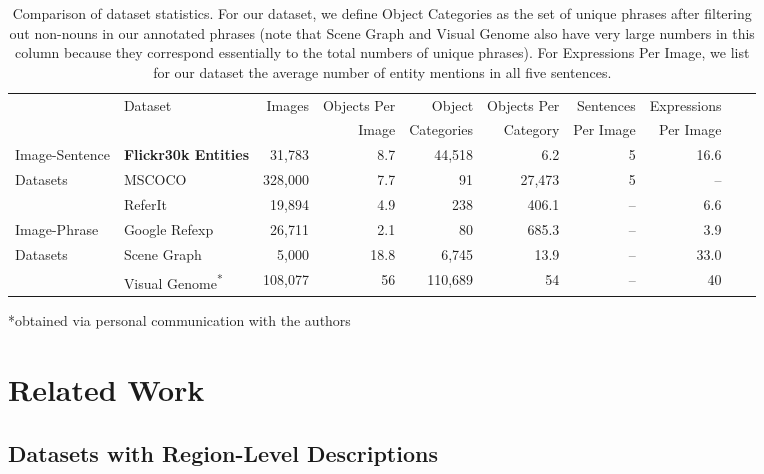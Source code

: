 \documentclass[twocolumn]{svjour3}
\begin{document}
\begin{table*}
\caption{Comparison of dataset statistics. For our dataset, we define Object Categories as the set of unique phrases after filtering out non-nouns in our annotated phrases (note that Scene Graph and Visual Genome also have very large numbers in this column because they correspond essentially to the total numbers of unique phrases). For Expressions Per Image, we list for our dataset the average number of entity mentions in all five sentences. }
\label{table:dataCompare}
\centering
\begin{tabular}{|l|l|r|r|r|r|r|r|r|r|}
\hline
& \multirow{2}{*}{Dataset} & \multirow{2}{*}{Images} &Objects Per & Object & Objects Per & Sentences & Expressions\\
&  & & Image & Categories &Category &  Per Image & Per Image\\
\hline
Image-Sentence & {\bf Flickr30k Entities} & 31,783 & 8.7 & 44,518 & 6.2 & 5 & 16.6 \\
Datasets & MSCOCO~\citep{lin2014microsoft} & 328,000 & 7.7 & 91 & 27,473 & 5 & -- \\
 \hline
 & ReferIt~\citep{kazemzadeh-EtAl:2014:EMNLP2014} & 19,894 & 4.9 & 238 & 406.1 & -- & 6.6\\
Image-Phrase & Google Refexp~\citep{mao2015generation} & 26,711 & 2.1 & 80 & 685.3 & -- & 3.9\\
Datasets & Scene Graph~\citep{Johnson2015CVPR} & 5,000 & 18.8 & 6,745 & 13.9 & -- & 33.0\\
& Visual Genome\textsuperscript{*}~\citep{krishnavisualgenome} & 108,077 & 56 & 110,689 & 54 & -- & 40 \\
\hline
\end{tabular}
\vspace{-3mm}
\flushleft\hspace{1mm}\begingroup
    \fontsize{6pt}{6pt}\selectfont
 *obtained via personal communication with the authors
\endgroup
\vspace{-3mm}
\end{table*}

\section{Related Work}
\label{relatedWork}

\subsection{Datasets with Region-Level Descriptions}
\label{sec:datasets}
\end{document}
